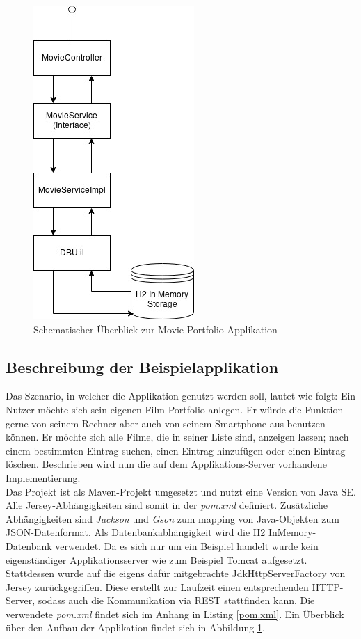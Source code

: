 \documentclass[fleqn,10.5pt,ngerman]{SelfArx}
\begin{document}
\begin{figure}[ht]\centering
	\includegraphics[width=6 cm]{Abbildungen/overview.jpg}
	\caption{Schematischer Überblick zur Movie-Portfolio Applikation}
	\label{fig:overview}
\end{figure}
\subsection{Beschreibung der Beispielapplikation}
Das Szenario, in welcher die Applikation genutzt werden soll, lautet wie folgt: Ein Nutzer möchte sich sein eigenen Film-Portfolio anlegen. Er würde die Funktion gerne von seinem Rechner aber auch von seinem Smartphone aus benutzen können. Er möchte sich alle Filme, die in seiner Liste sind, anzeigen lassen; nach einem bestimmten Eintrag suchen, einen Eintrag hinzufügen oder einen Eintrag löschen. Beschrieben wird nun die auf dem Applikations-Server vorhandene Implementierung. \\ Das Projekt ist als Maven-Projekt umgesetzt und nutzt eine Version von Java SE. Alle Jersey-Abhängigkeiten sind somit in der \textit{pom.xml} definiert. Zusätzliche Abhängigkeiten sind \textit{Jackson} und \textit{Gson} zum mapping von Java-Objekten zum JSON-Datenformat. Als Datenbankabhängigkeit wird die H2 InMemory-Datenbank verwendet. Da es sich nur um ein Beispiel handelt wurde kein eigenständiger Applikationsserver wie zum Beispiel Tomcat aufgesetzt. Stattdessen wurde auf die eigens dafür mitgebrachte JdkHttpServerFactory von Jersey zurückgegriffen. Diese erstellt zur Laufzeit einen entsprechenden HTTP-Server, sodass auch die Kommunikation via REST stattfinden kann. Die verwendete \textit{pom.xml} findet sich im Anhang in Listing \ref{pom.xml}.
Ein Überblick über den Aufbau der Applikation findet sich in Abbildung \ref{fig:overview}.
\end{document}

